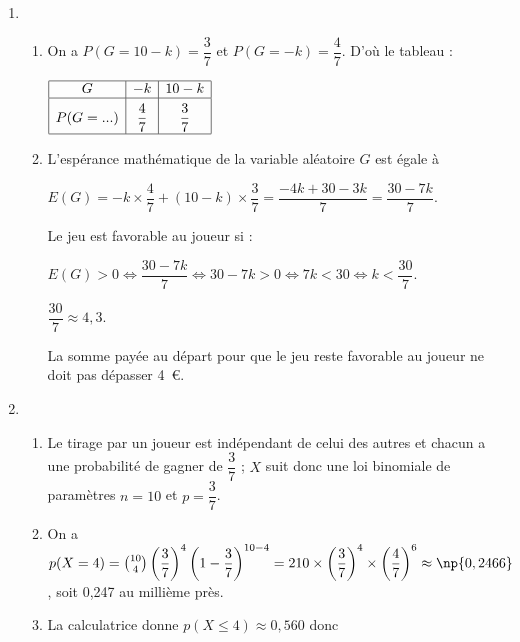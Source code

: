 \begin{enumerate}[resume]
\item %



	\begin{enumerate}
		\item %
On a $P(G = 10 - k) = \dfrac{3}{7}$ et $P(G = -k) = \dfrac{4}{7}$. D'où le tableau :

\begin{center}
$\begin{array}{|*{3}{c|}}\hline
G				&- k			&10 - k\\ \hline
P(G = ...)		&\dfrac{4}{7}	&\dfrac{3}{7}\rule[-3mm]{0mm}{9mm}\\ \hline
\end{array}$
\end{center}
		\item %
L'espérance mathématique de la variable aléatoire $G$ est égale à 
		
$E(G) = - k \times \dfrac{4}{7} + (10 - k) \times \dfrac{3}{7} = \dfrac{-4k + 30 - 3k}{7} = \dfrac{30 - 7k}{7}$.

Le jeu est favorable au joueur si :

$E(G) > 0 \iff \dfrac{30 - 7k}{7} \iff 30 - 7k > 0 \iff 7k < 30 \iff k < \dfrac{30}{7}$.

$\dfrac{30}{7} \approx 4,3$.

La somme payée au départ pour que le jeu reste favorable au joueur ne doit pas dépasser 4~\euro.	
	\end{enumerate}
\item %

	\begin{enumerate}
		\item %
Le tirage par un joueur est indépendant de celui des autres et chacun a une probabilité de gagner de $\dfrac{3}{7}$ ; $X$ suit donc une loi binomiale de paramètres $n = 10$ et $p = \dfrac{3}{7}$.
		\item %
On a $p(X = 4) = \binom{10}{4}\left(\dfrac{3}{7}\right)^4\left( 1 - \dfrac{3}{7}  \right)^{10-4} = 210 \times\left(\dfrac{3}{7}\right)^4 \times \left(\dfrac{4}{7}\right)^6 \approx \np{0,2466}$, soit 0,247 au millième près.
		\item  %
La calculatrice donne $p(X\leqslant 4) \approx 0,560$ donc 


\end{enumerate}
\end{enumerate}
